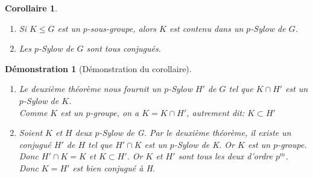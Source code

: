 \documentclass[a4paper, oneside]{report}
\theoremstyle{break}
\newtheorem{corollaire}[thm]{Corollaire}
\newtheorem*{demonstration}{Démonstration}
\begin{document}
\begin{corollaire}
\begin{enumerate}
\item  Si $K \leq G$ est un $p$-sous-groupe, alors $K$ est contenu dans un $p$-Sylow de $G$.

\medbreak

\item  Les $p$-Sylow de $G$ sont tous conjugués.

\end{enumerate}
\end{corollaire}

\begin{demonstration}[Démonstration du corollaire]
\begin{enumerate}

\item  Le deuxième théorème nous fournit un $p$-Sylow $H'$ de $G$ tel que $K \cap H'$ est un $p$-Sylow de $K$.\\
Comme $K$ est un $p$-groupe, on a $K = K \cap H'$, autrement dit: $K \subset H'$

\medbreak

\item Soient $K$ et $H$ deux $p$-Sylow de G. Par le deuxième théorème, il existe un conjugué $H'$ de $H$ tel que $H' \cap K$ est un $p$-Sylow de K. Or $K$ est un $p$-groupe. Donc $H' \cap K = K$ et $K \subset H'$. Or $K$ et $H'$ sont tous les deux d'ordre $p^m$. Donc $K = H'$ est bien conjugué à H.   

\end{enumerate}
\end{demonstration}
\end{document}
